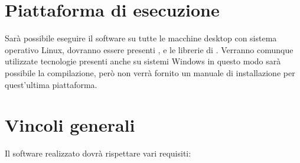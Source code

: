 \documentclass[../AnalisideiRequisiti.tex]{subfiles}
\begin{document}
\section{Piattaforma di esecuzione}
Sarà possibile eseguire il software su tutte le macchine desktop con sistema operativo Linux, dovranno essere presenti ,  e le librerie di . Verranno comunque utilizzate tecnologie presenti anche su sistemi Windows in questo modo sarà possibile la compilazione, però non verrà fornito un manuale di installazione per quest’ultima piattaforma.

\section{Vincoli generali}
Il software realizzato dovrà rispettare vari requisiti:
\end{document}
